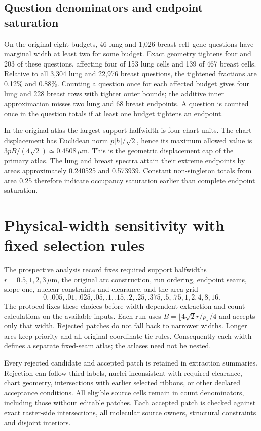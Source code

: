 \documentclass[10pt,letterpaper]{article}
\begin{document}
\FloatBarrier
\subsection{Question denominators and endpoint saturation}
On the original eight budgets, 46 lung and 1,026 breast cell--gene questions have marginal width at least two for some budget. Exact geometry tightens four and 203 of these questions, affecting four of 153 lung cells and 139 of 467 breast cells. Relative to all 3,304 lung and 22,976 breast questions, the tightened fractions are 0.12\% and 0.88\%. Counting a question once for each affected budget gives four lung and 228 breast rows with tighter outer bounds; the additive inner approximation misses two lung and 68 breast endpoints. A question is counted once in the question totals if at least one budget tightens an endpoint.



In the original atlas the largest support halfwidth is four chart units. The chart displacement has Euclidean norm $p|h|/\sqrt2$, hence its maximum allowed value is $3pB/(4\sqrt2)\simeq0.4508\,\mu\mathrm m$. This is the geometric displacement cap of the primary atlas. The lung and breast spectra attain their extreme endpoints by areas approximately 0.240525 and 0.573939. Constant non-singleton totals from area 0.25 therefore indicate occupancy saturation earlier than complete endpoint saturation.

\FloatBarrier
\section{Physical-width sensitivity with fixed selection rules}
The prospective analysis record fixes required support halfwidths $r=0.5,1,2,3\,\mu\mathrm m$, the original arc construction, run ordering, endpoint seams, slope one, nuclear constraints and clearance, and the area grid
\[
0,.005,.01,.025,.05,.1,.15,.2,.25,.375,.5,.75,1,2,4,8,16.
\]
The protocol fixes these choices before width-dependent extraction and count calculations on the available inputs. Each run uses $B=\lfloor4\sqrt2r/p\rfloor/4$ and accepts only that width. Rejected patches do not fall back to narrower widths. Longer arcs keep priority and all original coordinate tie rules. Consequently each width defines a separate fixed-seam atlas; the atlases need not be nested.

Every rejected candidate and accepted patch is retained in extraction summaries. Rejection can follow third labels, nuclei inconsistent with required clearance, chart geometry, intersections with earlier selected ribbons, or other declared acceptance conditions. All eligible source cells remain in count denominators, including those without editable patches. Each accepted patch is checked against exact raster-side intersections, all molecular source owners, structural constraints and disjoint interiors.
\end{document}
